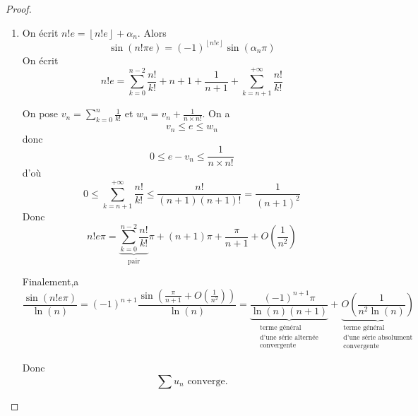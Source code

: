 \begin{proof}
\begin{enumerate}
		\item On écrit $n!e=\left\lfloor n!e\right\rfloor+\alpha_{n}$.
		Alors 
		\begin{equation}\sin(n!\pi e)=(-1)^{\left\lfloor n!e\right\rfloor}\sin(\alpha_{n}\pi)\end{equation}
		On écrit 
		\begin{equation}n!e=\sum_{k=0}^{n-2}\frac{n!}{k!}+n+1+\frac{1}{n+1}+\sum_{k=n+1}^{+\infty}\frac{n!}{k!}\end{equation}

		On pose $v_{n}=\sum_{k=0}^{n}\frac{1}{k!}$ et $w_{n}=v_{n}+\frac{1}{n\times n!}$. On a 
		\begin{equation}v_{n}\leqslant e\leqslant w_{n}\end{equation}
		donc 
		\begin{equation}0\leqslant e-v_{n}\leqslant\frac{1}{n\times n!}\end{equation}
		d'où
		\begin{equation}0\leqslant \sum_{k=n+1}^{+\infty}\frac{n!}{k!}\leqslant\frac{n!}{(n+1)(n+1)!}=\frac{1}{(n+1)^{2}}\end{equation}
		Donc 
		\begin{equation}n!e\pi = \underbrace{\sum_{k=0}^{n-2}\frac{n!}{k!}}_{\text{pair}}\pi+(n+1)\pi+\frac{\pi}{n+1}+O\left(\frac{1}{n^{2}}\right)\end{equation}

		Finalement,a
		\begin{equation}\frac{\sin(n!e\pi)}{\ln(n)}=(-1)^{n+1}\frac{\sin\left(\frac{\pi}{n+1}+O\left(\frac{1}{n^{2}}\right)\right)}{\ln(n)}=\underbrace{\frac{(-1)^{n+1}\pi}{\ln(n)(n+1)}}_{\substack{\text{terme général}\\\text{d'une série alternée}\\\text{convergente}}}+\underbrace{O\left(\frac{1}{n^{2}\ln(n)}\right)}_{\substack{\text{terme général}\\\text{d'une série absolument}\\\text{convergente}}}\end{equation}

		Donc 
		\begin{equation}\boxed{\sum u_{n}\text{ converge.}}\end{equation}
	\end{enumerate}
\end{proof}

